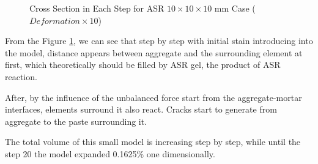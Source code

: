 \begin{figure}[ht!]
      

  \caption{Cross Section in Each Step for ASR $10 \times 10 \times 10$ mm Case ($Deformation \times 10$)}
  \label{fig:ASR_Small_ASR_CR}
  \end{figure}


From the Figure \ref{fig:ASR_Small_ASR_CR}, we can see that step by step with initial stain introducing into the model, distance appears between aggregate and the surrounding element at first, which theoretically should be filled by ASR gel, the product of ASR reaction.

After, by the influence of the unbalanced force start from the aggregate-mortar interfaces, elements surround it also react. Cracks start to generate from aggregate to the paste surrounding it.

The total volume of this small model is increasing step by step, while until the step 20 the model expanded 0.1625\% one dimensionally.

